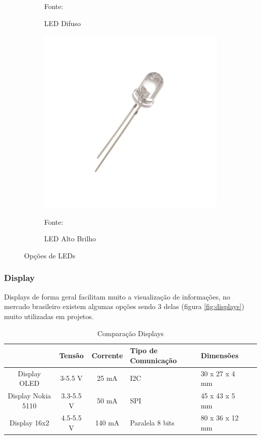 \begin{figure}[h!]
\begin{subfigure}[b]{0.22\textwidth}
    \caption{LED Difuso} Fonte: \cite{BaudaEletronica2019}
    \label{fig:led_difuso}
  \end{subfigure}
  \begin{subfigure}[b]{0.3\textwidth}
  \centering
    \includegraphics[width=\textwidth]{figuras/led_alto_brilho.jpg}
    \caption{LED Alto Brilho} Fonte: \cite{CurtoCircuito2019}
    \label{fig:led_alto_brilho}
  \end{subfigure}
  \caption{Opções de LEDs}
\end{figure}

\subsubsection*{Display}

Displays de forma geral facilitam muito a visualização de informações, no mercado brasileiro existem algumas opções sendo 3 delas (figura \ref{fig:displays}) muito utilizadas em projetos.

\begin{table}[h!]
\centering
\begin{tabular}{|c|c|c|l|l|l|}
\hline
                & Tensão	& Corrente	& Tipo de Comunicação	& Dimensões \\ \hline
Display OLED    & 3-5.5 V  &  25 mA    &          I2C			&          30 x 27 x 4 mm \\ \hline
Display Nokia 5110 &  3.3-5.5 V & 50 mA &		 SPI			&          
45 x 43 x 5 mm \\ \hline
Display 16x2  	&	4.5-5.5 V	&	140 mA	&  Paralela 8 bits	& 80 x 36 x 12 mm \\ \hline
\end{tabular}
\caption{Comparação Displays}
\label{tab:displays}
\end{table}


